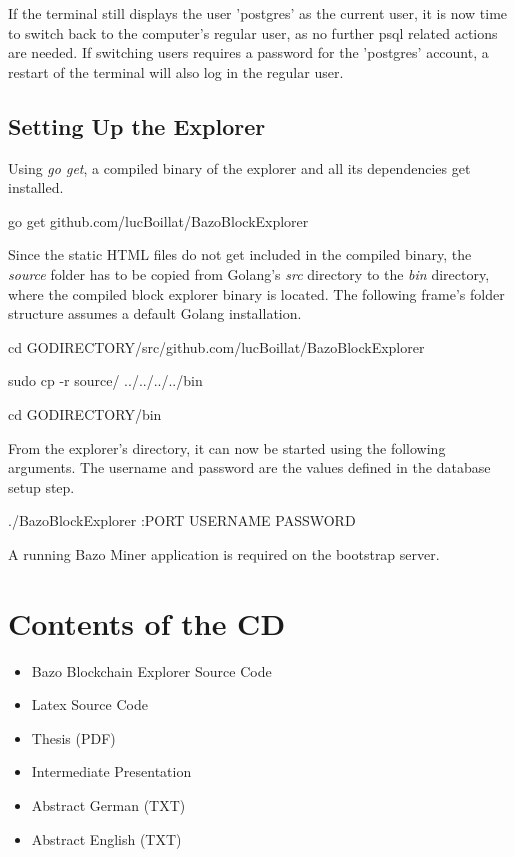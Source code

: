 If the terminal still displays the user 'postgres' as the current user, it is now time to switch back to the computer's regular user, as no further psql related actions are needed. If switching users requires a password for the 'postgres' account, a restart of the terminal will also log in the regular user.

\section{Setting Up the Explorer}

Using \emph{go get}, a compiled binary of the explorer and all its dependencies get installed.

\begin{framed}
go get github.com/lucBoillat/BazoBlockExplorer
\end{framed}

Since the static HTML files do not get included in the compiled binary, the \emph{source} folder has to be copied from Golang's \emph{src} directory to the \emph{bin} directory, where the compiled block explorer binary is located. The following frame's folder structure assumes a default Golang installation.

\begin{framed}
cd GODIRECTORY/src/github.com/lucBoillat/BazoBlockExplorer

sudo cp -r source/ ../../../../bin

cd GODIRECTORY/bin

\end{framed}

From the explorer's directory, it can now be started using the following arguments. The username and password are the values defined in the database setup step.
\begin{framed}
./BazoBlockExplorer :PORT USERNAME PASSWORD
\end{framed}

A running Bazo Miner application is required on the bootstrap server.

\chapter{Contents of the CD}

\begin{itemize}
\item Bazo Blockchain Explorer Source Code
\item Latex Source Code
\item Thesis (PDF)
\item Intermediate Presentation
\item Abstract German (TXT)
\item Abstract English (TXT)
\end{itemize}
